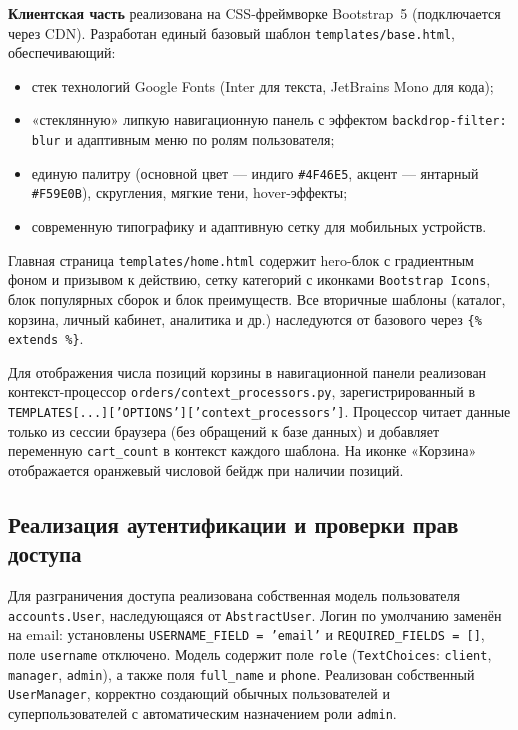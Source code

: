 \textbf{Клиентская часть} реализована на CSS-фреймворке Bootstrap~5 (подключается через CDN). Разработан единый базовый шаблон \texttt{templates/base.html}, обеспечивающий:
\begin{itemize}
    \item стек технологий Google Fonts (Inter для текста, JetBrains Mono для кода);
    \item «стеклянную» липкую навигационную панель с эффектом \texttt{backdrop-filter: blur} и адаптивным меню по ролям пользователя;
    \item единую палитру (основной цвет --- индиго \texttt{\#4F46E5}, акцент --- янтарный \texttt{\#F59E0B}), скругления, мягкие тени, hover-эффекты;
    \item современную типографику и адаптивную сетку для мобильных устройств.
\end{itemize}

Главная страница \texttt{templates/home.html} содержит hero-блок с градиентным фоном и призывом к действию, сетку категорий с иконками \texttt{Bootstrap Icons}, блок популярных сборок и блок преимуществ. Все вторичные шаблоны (каталог, корзина, личный кабинет, аналитика и др.) наследуются от базового через \texttt{\{\% extends \%\}}.

Для отображения числа позиций корзины в навигационной панели реализован контекст-процессор \texttt{orders/context\_processors.py}, зарегистрированный в \texttt{TEMPLATES[...]['OPTIONS']['context\_processors']}. Процессор читает данные только из сессии браузера (без обращений к базе данных) и добавляет переменную \texttt{cart\_count} в контекст каждого шаблона. На иконке «Корзина» отображается оранжевый числовой бейдж при наличии позиций.

\subsection{Реализация аутентификации и проверки прав доступа}

Для разграничения доступа реализована собственная модель пользователя \texttt{accounts.User}, наследующаяся от \texttt{AbstractUser}. Логин по умолчанию заменён на email: установлены \texttt{USERNAME\_FIELD = 'email'} и \texttt{REQUIRED\_FIELDS = []}, поле \texttt{username} отключено. Модель содержит поле \texttt{role} (\texttt{TextChoices}: \texttt{client}, \texttt{manager}, \texttt{admin}), а также поля \texttt{full\_name} и \texttt{phone}. Реализован собственный \texttt{UserManager}, корректно создающий обычных пользователей и суперпользователей с автоматическим назначением роли \texttt{admin}.

